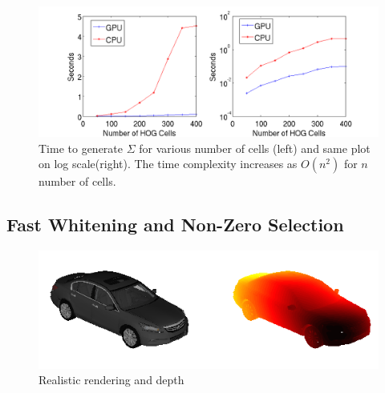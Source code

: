 \documentclass[10pt,twocolumn,letterpaper]{article}
\begin{document}
\begin{figure}[t]
  \begin{center}
     \includegraphics[width=0.9\linewidth]{covariancetime} 
  \end{center}
  \caption{Time to generate $\Sigma$ for various number of cells (left) and same plot on log scale(right). The time complexity increases as $O(n^2)$ for $n$ number of cells.}
  \label{fig:covariancetime_crop}
\end{figure}
 

\subsection{Fast Whitening and Non-Zero Selection}

\begin{figure}[t]
  \begin{center}
     \includegraphics[width=0.9\linewidth]{whiten_orig_depth} 
  \end{center}
  \caption{Realistic rendering and depth}
  \label{fig:rendering}
  \end{figure}
 
\end{document}
